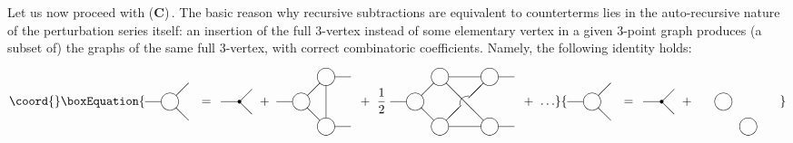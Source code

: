 \documentclass[a4paper,12pt]{article}
\begin{document}
Let us now proceed with (\textbf{C})\,. The basic reason why recursive
subtractions are equivalent to counterterms lies in the auto-recursive
nature of the perturbation series itself: an insertion of the full 3-vertex
instead of some elementary vertex in a given 3-point graph produces
(a subset of) the graphs of the same full 3-vertex, with correct
combinatoric coefficients. Namely, the following identity holds:
\begin{equation}\coord{}\boxEquation{
\label{autorec}
\parbox{1.5cm}{
\begin{picture}(35,60)
\put(20,30){\circle{14}}
\put(0,30){\line(1,0){13}}
\put(25,35){\line(1,1){10}}
\put(25,25){\line(1,-1){10}}
\end{picture}
} =
\parbox{1.2cm}{
\begin{picture}(30,60)
\put(20,30){\circle*{3}}
\put(5,30){\line(1,0){15}}
\put(20,30){\line(1,1){10}}
\put(20,30){\line(1,-1){10}}
\end{picture}
} + \
\parbox{2.3cm}{
\begin{picture}(60,60)
\put(20,30){\circle{14}}
\put(40,10){\circle{14}}
\put(40,50){\circle{14}}
\put(0,30){\line(1,0){13}}
\put(47,50){\line(1,0){13}}
\put(47,10){\line(1,0){13}}
\put(25,35){\line(1,1){10}}
\put(25,25){\line(1,-1){10}}
\put(40,17){\line(0,1){26.5}}
\end{picture}
} + \ \frac{1}{2} \
\parbox{3.7cm}{
\begin{picture}(100,60)
\put(20,30){\circle{14}}
\put(40,10){\circle{14}}
\put(40,50){\circle{14}}
\put(80,10){\circle{14}}
\put(80,50){\circle{14}}
\put(87,50){\line(1,0){13}}
\put(87,10){\line(1,0){13}}
\put(0,30){\line(1,0){13}}
\put(47,50){\line(1,0){26}}
\put(47,10){\line(1,0){26}}
\put(25,35){\line(1,1){10}}
\put(25,25){\line(1,-1){10}}
\put(45,15){\line(1,1){12}}
\put(75,45){\line(-1,-1){12}}
\put(45,45){\line(1,-1){30}}
\put(63.5,27){\oval(15,15)[tl]}
\end{picture}
} + \ \ldots
}{
\parbox{1.5cm}{
\begin{picture}(35,60)
\put(20,30){\circle{14}}
\put(0,30){\line(1,0){13}}
\put(25,35){\line(1,1){10}}
\put(25,25){\line(1,-1){10}}
\end{picture}
} =
\parbox{1.2cm}{
\begin{picture}(30,60)
\put(20,30){\circle*{3}}
\put(5,30){\line(1,0){15}}
\put(20,30){\line(1,1){10}}
\put(20,30){\line(1,-1){10}}
\end{picture}
} + \
\parbox{2.3cm}{
\begin{picture}(60,60)
\put(20,30){\circle{14}}
\put(40,10){\circle{14}}

\end{picture}}}
\end{equation}
\end{document}
